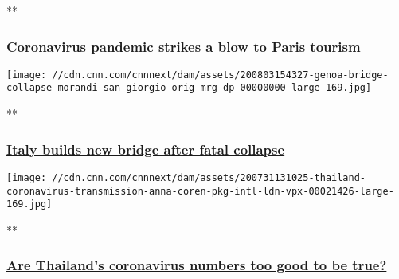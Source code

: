 **

\hypertarget{coronavirus-pandemic-strikes-a-blow-to-paris-tourism}{%
\subsubsection{\texorpdfstring{\href{/videos/travel/2020/08/02/paris-france-tourism-coronavirus-bell-pkg-vpx.cnn/video/playlists/around-the-world/}{Coronavirus
pandemic strikes a blow to Paris
tourism}}{Coronavirus pandemic strikes a blow to Paris tourism}}\label{coronavirus-pandemic-strikes-a-blow-to-paris-tourism}}

\href{/videos/world/2020/08/03/genoa-bridge-collapse-morandi-san-giorgio-orig-mrg-dp.cnn/video/playlists/around-the-world/}{}

\texttt{[image: //cdn.cnn.com/cnnnext/dam/assets/200803154327-genoa-bridge-collapse-morandi-san-giorgio-orig-mrg-dp-00000000-large-169.jpg]}

**

\hypertarget{italy-builds-new-bridge-after-fatal-collapse}{%
\subsubsection{\texorpdfstring{\href{/videos/world/2020/08/03/genoa-bridge-collapse-morandi-san-giorgio-orig-mrg-dp.cnn/video/playlists/around-the-world/}{Italy
builds new bridge after fatal
collapse}}{Italy builds new bridge after fatal collapse}}\label{italy-builds-new-bridge-after-fatal-collapse}}

\href{/videos/world/2020/07/31/thailand-coronavirus-transmission-anna-coren-pkg-intl-ldn-vpx.cnn/video/playlists/around-the-world/}{}

\texttt{[image: //cdn.cnn.com/cnnnext/dam/assets/200731131025-thailand-coronavirus-transmission-anna-coren-pkg-intl-ldn-vpx-00021426-large-169.jpg]}

**

\hypertarget{are-thailands-coronavirus-numbers-too-good-to-be-true-}{%
\subsubsection{\texorpdfstring{\href{/videos/world/2020/07/31/thailand-coronavirus-transmission-anna-coren-pkg-intl-ldn-vpx.cnn/video/playlists/around-the-world/}{Are
Thailand's coronavirus numbers too good to be true?
}}{Are Thailand's coronavirus numbers too good to be true? }}\label{are-thailands-coronavirus-numbers-too-good-to-be-true-}}

